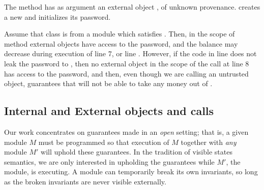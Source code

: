  The method  has as  argument an external object , of unknown provenance.
 creates a new  and initializes its password. 

Assume that class  is from a module which satisfies \SrobustB. 
Then, 
in the scope of  method  external objects have access to the password, 
and the balance may decrease  
during execution of  line 7, or   line . 
However, if the code in line  does not leak the password to , then no external object
in  the scope of the call  at line 8 has access to the password, and then,
even though we are calling   an untrusted object, \SrobustB guarantees that 
 will not be able to take any money out of  .
 
 

 
\subsection{Internal and External objects and calls}
\label{s:concepts}

Our work concentrates on guarantees made in an \emph{open} setting; that is, a given module
$M$ must be programmed so that %
execution of $M$ together with \emph{any} \externalM 
module $M'$ will uphold these guarantees. In the tradition of
visible states semantics, we are  only interested in upholding the guarantees while 
$M'$, the  \emph{\externalM} module, is executing. A module can
temporarily break its own invariants,
so long as the broken invariants are never visible externally.
   
